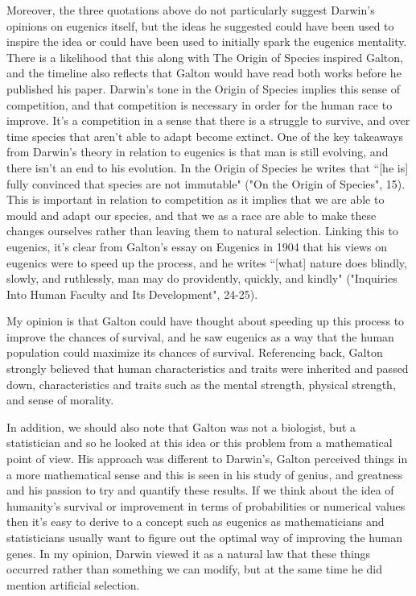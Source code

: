 \documentclass[11pt, oneside]{article}
\begin{document}
\par Moreover, the three quotations above do not particularly suggest Darwin's opinions on eugenics itself, but the ideas he suggested could have been used to inspire the idea or could have been used to initially spark the eugenics mentality. There is a likelihood that this along with The Origin of Species inspired Galton, and the timeline also reflects that Galton would have read both works before he published his paper. Darwin's tone in the Origin of Species implies this sense of competition, and that competition is necessary in order for the human race to improve. It's a competition in a sense that there is a struggle to survive, and over time species that aren't able to adapt become extinct. One of the key takeaways from Darwin's theory in relation to eugenics is that man is still evolving, and there isn't an end to his evolution. In the Origin of Species he writes that ``[he is] fully convinced that species are not immutable" ("On the Origin of Species", 15). This is important in relation to competition as it implies that we are able to mould and adapt our species, and that we as a race are able to make these changes ourselves rather than leaving them to natural selection. Linking this to eugenics, it's clear from Galton's essay on Eugenics in 1904 that his views on eugenics were to speed up the process, and he writes ``[what] nature does blindly, slowly, and ruthlessly, man may do providently, quickly, and kindly" ("Inquiries Into Human Faculty and Its Development", 24-25). 

\par My opinion is that Galton could have thought about speeding up this process to improve the chances of survival, and he saw eugenics as a way that the human population could maximize its chances of survival. Referencing back, Galton strongly believed that human characteristics and traits were inherited and passed down, characteristics and traits such as the mental strength, physical strength, and sense of morality. 

\par In addition, we should also note that Galton was not a biologist, but a statistician and so he looked at this idea or this problem from a mathematical point of view. His approach was different to Darwin's, Galton perceived things in a more mathematical sense and this is seen in his study of genius, and greatness and his passion to try and quantify these results. If we think about the idea of humanity's survival or improvement in terms of probabilities or numerical values then it's easy to derive to a concept such as eugenics as mathematicians and statisticians usually want to figure out the optimal way of improving the human genes. In my opinion, Darwin viewed it as a natural law that these things occurred rather than something we can modify, but at the same time he did mention artificial selection.
\end{document}
